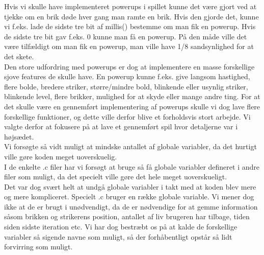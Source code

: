 Hvis vi skulle have implementeret powerups i spillet kunne det være gjort ved at tjekke om en brik døde hver gang man ramte en brik. Hvis den gjorde det, kunne vi f.eks. lade de sidste tre bit af millis() bestemme om man fik en powerup. Hvis de sidste tre bit gav f.eks. 0 kunne man få en powerup. På den måde ville det være tilfældigt om man fik en powerup, man ville have 1/8 sandsynlighed for at det skete. \\

Den store udfordring med powerups er dog at implementere en masse forskellige sjove features de skulle have. En powerup kunne f.eks. give langsom hastighed, flere bolde, bredere striker, større/mindre bold, blinkende eller usynlig striker, blinkende level, flere brikker, mulighed for  at skyde eller mange andre ting. For at det skulle være en gennemført implementering af powerups skulle vi dog lave flere forskellige funktioner, og dette ville derfor blive et forholdsvis stort arbejde. Vi valgte derfor at fokusere på at lave et gennemført spil hvor detaljerne var i højsædet.\\

Vi forsøgte så vidt muligt at mindske antallet af globale variabler, da det hurtigt ville gøre koden meget uoverskuelig.\\
I de enkelte .c filer har vi forsøgt at bruge så få globale variabler defineret i andre filer som muligt, da det specielt ville gøre det hele meget uoverskueligt. \\
Det var dog svært helt at undgå globale variabler i takt med at koden blev mere og mere kompliceret. Specielt .c bruger en række globale variable. Vi mener dog ikke at de er brugt i unødvendigt, da de er nødvendige for at gemme information såsom brikken og strikerens position, antallet af liv brugeren har tilbage, tiden siden sidste iteration etc.
Vi har dog bestræbt os på at kalde de forskellige variabler så sigende navne som muligt, så der forhåbentligt opstår så lidt forvirring som muligt. 